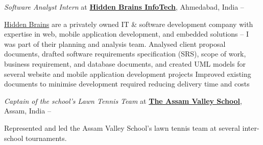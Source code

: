 \documentclass[a4paper,10pt,oneside]{article}
\begin{document}
\begin{body}
\BigEntryGapNoBreak
\textit{Software Analyst Intern} at
\href{http://www.hiddenbrains.com/}
{\textbf{Hidden Brains InfoTech}},
Ahmedabad, India
\hfill
{} --
\EntryGapNoBreak
\begin{detailwithoutsubheading}
\href{http://www.hiddenbrains.com/}{Hidden Brains} are a privately owned IT \& software development company with expertise in web, mobile application development, and embedded solutions -- I was part of their planning and analysis team.
\BulletItem
Analysed client proposal documents, drafted software requirements specification (SRS), scope of work, business requirement, and database documents, and created UML models for several website and mobile application development projects
\BulletItem
Improved existing documents to minimise development required reducing delivery time and costs
\end{detailwithoutsubheading}

\BigEntryGapNoBreak
\textit{Captain of the school's Lawn Tennis Team} at \href{http://www.assamvalleyschool.com}{\textbf{The Assam Valley School}},
Assam, India
\hfill
{} --
\begin{detailwithoutsubheading}
\BulletItem
Represented and led the Assam Valley School's lawn tennis team at several inter-school tournaments.
\end{detailwithoutsubheading}
\vspace{-5pt}
\hline


\end{body}
\end{document}
